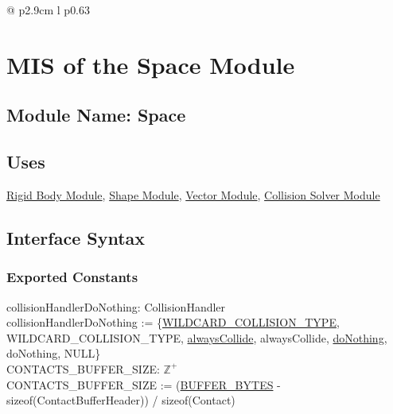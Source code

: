 \documentclass[12pt]{article}
\newcommand{\colDescrip}{0.63\textwidth}
\newcommand{\newfunc}{\\[1.5em]}
\newcommand{\UZ}{$\mathbb{Z}^+$}
\newcommand{\Body}{\hyperref[MISBody]{Rigid Body Module}}
\newcommand{\Shape}{\hyperref[MISShape]{Shape Module}}
\newcommand{\Vector}{\hyperref[MISVector]{Vector Module}}
\newcommand{\Collision}{\hyperref[MISCollision]{Collision Solver Module}}
\begin{document}
\begin{longtable*}{@{} p{2.9cm} l p{\colDescrip}}
\end{longtable*}
	

\section{MIS of the Space Module} \label{MISSpace}

\subsection{Module Name: Space}

\subsection{Uses} \label{SecUSpace}
	\Body, \Shape, \Vector, \Collision

\subsection{Interface Syntax}

\subsubsection{Exported Constants} \label{SecECSpace}
	collisionHandlerDoNothing: CollisionHandler \\
	collisionHandlerDoNothing := \{\hyperref[SecECControl]{WILDCARD_COLLISION_TYPE}, WILDCARD_COLLISION_TYPE, \hyperref[SecLFSpace]{alwaysCollide}, alwaysCollide, \hyperref[SecLFSpace]{doNothing}, doNothing, NULL\} \\
	\newline
	CONTACTS_BUFFER_SIZE: \UZ \\
	CONTACTS_BUFFER_SIZE := (\hyperref[SecECControl]{BUFFER_BYTES} - sizeof(ContactBufferHeader)) / sizeof(Contact)
	
\end{document}
